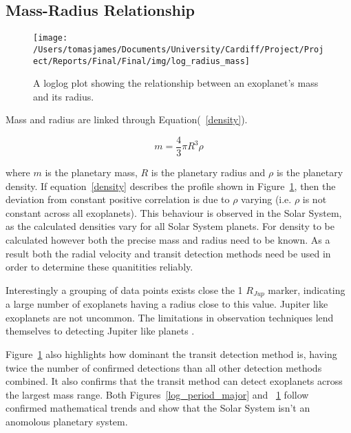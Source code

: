 \documentclass{report}
\begin{document}
\subsection*{Mass-Radius Relationship}

\begin{figure}[H]
\centering
    \texttt{[image: /Users/tomasjames/Documents/University/Cardiff/Project/Project/Reports/Final/Final/img/log\_radius\_mass]}
\caption{A loglog plot showing the relationship between an exoplanet's mass and its radius.}\label{log_radius_mass}
\end{figure}

Mass and radius are linked through Equation(~\ref{density}).

\begin{equation} \label{density}
    m = \frac{4}{3}\pi R^3 \rho
\end{equation}

 where $m$ is the planetary mass, $R$ is the planetary radius and $\rho$ is the planetary density. If equation~\ref{density} describes the profile shown in Figure~\ref{log_radius_mass}, then the deviation from constant positive correlation is due to $\rho$ varying (i.e. $\rho$ is not constant across all exoplanets). This behaviour is observed in the Solar System, as the calculated densities vary for all Solar System planets. For density to be calculated however both the precise mass and radius need to be known. As a result both the radial velocity and transit detection methods need be used in order to determine these quanitities reliably.

 Interestingly a grouping of data points exists close the 1 $R_{Jup}$ marker, indicating a large number of exoplanets having a radius close to this value. Jupiter like exoplanets are not uncommon. The limitations in observation techniques lend themselves to detecting Jupiter like planets \parencite{stats}. 

 Figure~\ref{log_radius_mass} also highlights how dominant the transit detection method is, having twice the number of confirmed detections than all other detection methods combined. It also confirms that the transit method can detect exoplanets across the largest mass range. Both Figures~\ref{log_period_major} and ~\ref{log_radius_mass} follow confirmed mathematical trends and show that the Solar System isn't an anomolous planetary system.

\end{document}
